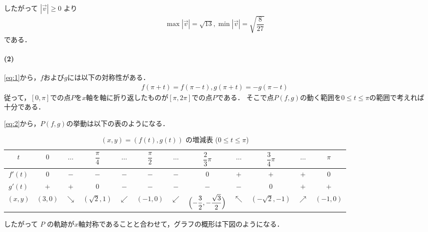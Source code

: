 \documentclass[../../main.tex]{subfiles}
\begin{document}
したがって $|\vec{v}| \ge 0$ より
\begin{align}
  \max |\vec{v}| = \sqrt{13}, \min |\vec{v}| = \sqrt{\dfrac{8}{27}}
\end{align}
である．

\paragraph{(2)}

\cref{eq:1}から，$f$および$g$には以下の対称性がある．
\begin{align}
  f(\pi+t) = f(\pi-t), g(\pi+t) = -g(\pi-t) \label{eq:3}
\end{align}
従って，$[0,\pi]$での点$P$を$x$軸を軸に折り返したものが$[\pi,2\pi]$での点$P$である．
そこで点$P(f,g)$の動く範囲を$0 \le t \le \pi$の範囲で考えれば十分である．

\cref{eq:2}から，$P(f,g)$の挙動は以下の表のようになる．

\begin{table}[htb]
  \centering
  \caption{$(x,y) = (f(t), g(t))$ の増減表 ($0 \le t \le \pi$)}
  \label{tab:parametric_curve_monotonicity}
  \renewcommand{\arraystretch}{1.4}
  \begin{tabular}{c|ccccccccccc}
    $t$ & $0$ & $\dots$ & $\dfrac{\pi}{4}$ & $\dots$ & $\dfrac{\pi}{2}$ & $\dots$ & $\dfrac{2}{3}\pi$ & $\dots$ & $\dfrac{3}{4}\pi$ & $\dots$ & $\pi$ \\ \hline
    $f'(t)$ & $0$ & $-$ & $-$ & $-$ & $-$ & $-$ & $0$ & $+$ & $+$ & $+$ & $0$ \\ \hline
    $g'(t)$ & $+$ & $+$ & $0$ & $-$ & $-$ & $-$ & $-$ & $-$ & $0$ & $+$ & $+$ \\ \hline
    $(x,y)$ & $(3,0)$ & $\searrow$ & $(\sqrt{2},1)$ & $\swarrow$ & $(-1,0)$ & $\swarrow$ & $\Bigl(-\dfrac{3}{2}, -\dfrac{\sqrt{3}}{2}\Bigr)$ & $\nwarrow$ & $(-\sqrt{2},-1)$ & $\nearrow$ & $(-1,0)$
  \end{tabular}
\end{table}

したがって $P$ の軌跡が$x$軸対称であることと合わせて，グラフの概形は下図のようになる．
\end{document}
